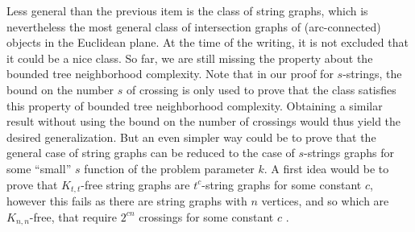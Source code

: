 \documentclass{amsart}
\begin{document}
    Less general than the previous item is the class of string graphs, which is nevertheless the most general class of intersection graphs of (arc-connected) objects in the Euclidean plane.  At the time of the writing, it is not excluded that it could be a nice class. So far, we are still missing the property about the bounded tree neighborhood complexity. Note that in our proof for $s$-strings, the bound on the number $s$ of crossing is only used to prove that the class satisfies this property of bounded tree neighborhood complexity. Obtaining a similar result without using the bound on the number of crossings would thus yield the desired generalization. But an even simpler way could be to prove that the general case of string graphs can be reduced to the case of $s$-strings graphs for some ``small'' $s$ function of the problem parameter $k$. A first idea would be to prove that $K_{t,t}$-free string graphs are $t^c$-string graphs for some constant $c$, however this fails as there are string graphs with $n$ vertices, and so which are $K_{n,n}$-free, that require $2^{cn}$ crossings for some constant $c$ \cite{stringexpo}.


\bigskip
 
\end{document}
